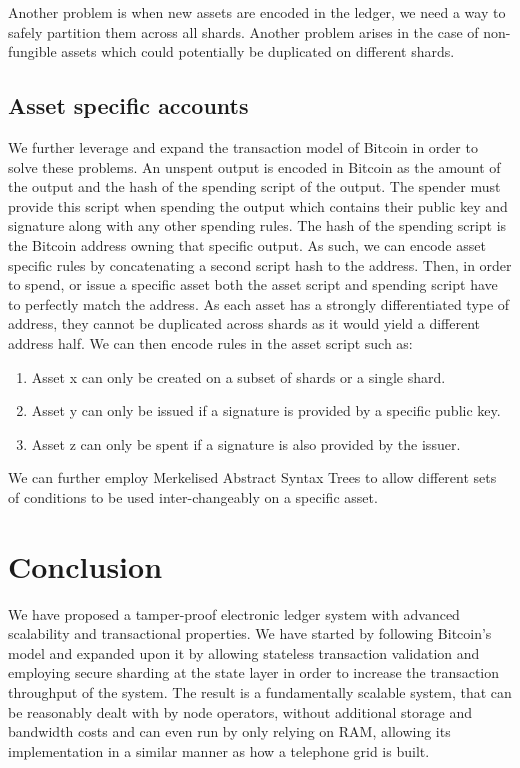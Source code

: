 \documentclass[notitlepage]{article}
\begin{document}
Another problem is when new assets are encoded in the ledger, we need a way to safely partition them across all shards. Another problem arises in the case of non-fungible assets which could potentially be duplicated on different shards. 

\subsection{Asset specific accounts}
We further leverage and expand the transaction model of Bitcoin in order to solve these problems. An unspent output is encoded in Bitcoin as the amount of the output and the hash of the spending script of the output. The spender must provide this script when spending the output which contains their public key and signature along with any other spending rules. The hash of the spending script is the Bitcoin address owning that specific output. As such, we can encode asset specific rules by concatenating a second script hash to the address. Then, in order to spend, or issue a specific asset both the asset script and spending script have to perfectly match the address. As each asset has a strongly differentiated type of address, they cannot be duplicated across shards as it would yield a different address half. We can then encode rules in the asset script such as:
\begin{enumerate}
  \item Asset x can only be created on a subset of shards or a single shard.
  \item Asset y can only be issued if a signature is provided by a specific public key.
  \item Asset z can only be spent if a signature is also provided by the issuer. 
\end{enumerate}

We can further employ Merkelised Abstract Syntax Trees \cite{mast} to allow different sets of conditions to be used inter-changeably on a specific asset.

\clearpage

\section{Conclusion}
We have proposed a tamper-proof electronic ledger system with advanced scalability and transactional properties. We have started by following Bitcoin's model and expanded upon it by allowing stateless transaction validation and employing secure sharding at the state layer in order to increase the transaction throughput of the system. The result is a fundamentally scalable system, that can be reasonably dealt with by node operators, without additional storage and bandwidth costs and can even run by only relying on RAM, allowing its implementation in a similar manner as how a telephone grid is built. 
\end{document}
